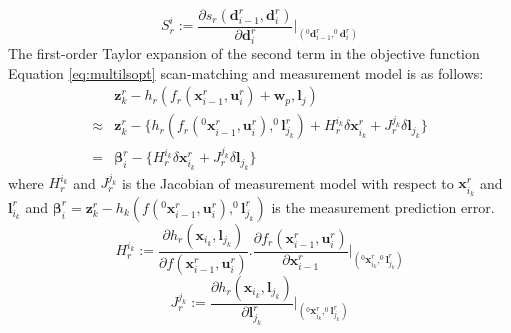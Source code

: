 \begin{equation}
S_r^{i} := \frac{\partial s_r(\textbf{d}^r_{i-1}, \textbf{d}^r_{i})}{\partial \textbf{d}_{i}^r} \bigg\rvert_{(^0\textbf{d}_{i-1}^r,^0\textbf{d}_{i}^r)}
\end{equation}
The first-order Taylor expansion of the second term in the objective function Equation \ref{eq:multilsopt} scan-matching and measurement model is as follows:
\begin{align}
& \textbf{z}_{k}^r - h_r(f_r(\textbf{x}_{i-1}^r, \textbf{u}_i^r) + \textbf{w}_p, \textbf{l}_j) \\
\approx & \textbf{z}_{k}^r - \{ h_r(f_r(^0\textbf{x}_{i-1}^r, \textbf{u}_i^r), ^0\textbf{l}^r_{j_k}) + H_r^{i_k}\delta \textbf{x}_{i_k}^r + J_r^{j_k} \delta \textbf{l}_{j_k} \} \\
= & \pmb\beta_i^r - \{ H_r^{i_k}\delta \textbf{x}_{i_k}^r + J_r^{j_k} \delta \textbf{l}_{j_k}\}
\label{eq:measlin}
\end{align}
where $H_r^{i_k}$ and $J_r^{j_k}$ is the Jacobian of measurement model with respect to $\textbf{x}^r_{i_k}$ and $\textbf{l}^r_{i_k}$ and $\pmb\beta_i^r = \textbf{z}_{k}^r - h_k(f(^0\textbf{x}_{i-1}^r, \textbf{u}_i^r), ^0\textbf{l}^r_{j_k})$ is the measurement prediction error.
\begin{equation}
H_r^{i_k} := \frac{\partial h_r(\textbf{x}_{i_k}, \textbf{l}_{j_k})}{\partial f(\textbf{x}_{i-1}^r, \textbf{u}_i^r)}.\frac{\partial f_r(\textbf{x}^r_{i-1}, \textbf{u}^r_{i})}{\partial \textbf{x}_{i-1}^r} \bigg\rvert_{(^0\textbf{x}_{i_k}^r,^0\textbf{l}_{j_k}^r)}
\end{equation}
\begin{equation}
J_r^{j_k} := \frac{\partial h_r(\textbf{x}_{i_k}, \textbf{l}_{j_k})}{\partial \textbf{l}_{j_k}^r} \bigg\rvert_{(^0\textbf{x}_{i_k}^r,^0\textbf{l}_{j_k}^r)}
\end{equation}
 
